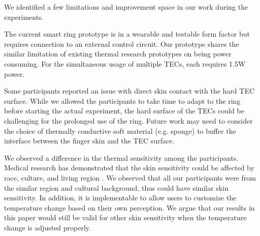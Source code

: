 \documentclass[preprint,12pt]{elsarticle}
\begin{document}

We identified a few limitations and improvement space in our work during the experiments.

The current smart ring prototype is in a wearable and testable form factor but requires connection to an external control circuit. Our prototype shares the similar limitation of existing thermal research prototypes on being power consuming. For the simultaneous usage of multiple TECs, each requires 1.5W power.

Some participants reported an issue with direct skin contact with the hard TEC surface. While we allowed the participants to take time to adapt to the ring before starting the actual experiment, the hard surface of the TECs could be challenging for the prolonged use of the ring. Future work may need to consider the choice of thermally conductive soft material (e.g. sponge) to buffer the interface between the finger skin and the TEC surface.

We observed a difference in the thermal sensitivity among the participants. Medical research has demonstrated that the skin sensitivity could be affected by race, culture, and living region \cite{17}. We observed that all our participants were from the similar region and cultural background, thus could have similar skin sensitivity. In addition, it is implementable to allow users to customize the temperature change based on their own perception. We argue that our results in this paper would still be valid for other skin sensitivity when the temperature change is adjusted properly.
\end{document}
